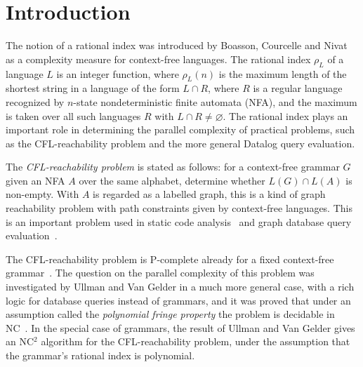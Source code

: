 \documentclass[runningheads]{llncs}
\renewcommand{\emptyset}{\varnothing}
\begin{document}
\section{Introduction}\label{section_introduction}

The notion of a rational index was introduced by Boasson, Courcelle and Nivat~\cite{RatBasic}
as a complexity measure for context-free languages.
The rational index $\rho_L$ of a language $L$ is an integer function,
where $\rho_L(n)$ is the maximum length of the shortest string in a language of the form $L \cap R$,
where $R$ is a regular language recognized by $n$-state nondeterministic finite automata (NFA),
and the maximum is taken over all such languages $R$ with $L \cap R \neq \emptyset$.
The rational index plays an important role
in determining the parallel complexity of practical problems,
such as the CFL-reachability problem
and the more general Datalog query evaluation.

The \emph{CFL-reachability problem} is stated as follows:
for a context-free grammar $G$
given an NFA $A$ over the same alphabet,
determine whether $L(G) \cap L(A)$ is non-empty.
With $A$ is regarded as a labelled graph,
this is a kind of graph reachability problem
with path constraints given by context-free languages.
This is an important problem used in static code analysis~\cite{RepsBasic}
and graph database query evaluation~\cite{Yannakakis}.

The CFL-reachability problem is P-complete
already for a fixed context-free grammar~\cite{PCompl}.
The question on the parallel complexity of this problem
was investigated by Ullman and Van Gelder \cite{Ullman}
in a much more general case,
with a rich logic for database queries instead of grammars,
and it was proved that under
an assumption called the \emph{polynomial fringe property}
the problem is decidable in NC~\cite{Ullman}.
In the special case of grammars,
the result of Ullman and Van Gelder \cite{Ullman}
gives an NC$^2$ algorithm for the CFL-reachability problem,
under the assumption that the grammar's rational index is polynomial.

\end{document}

